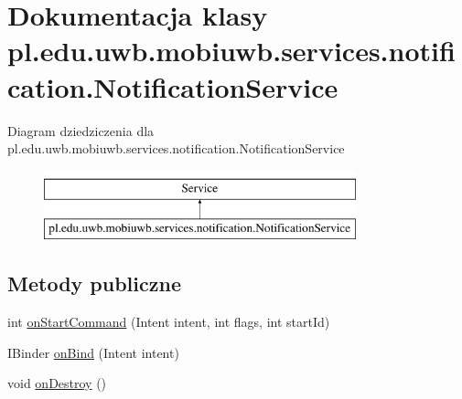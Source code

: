 \hypertarget{classpl_1_1edu_1_1uwb_1_1mobiuwb_1_1services_1_1notification_1_1_notification_service}{}\section{Dokumentacja klasy pl.\+edu.\+uwb.\+mobiuwb.\+services.\+notification.\+Notification\+Service}
\label{classpl_1_1edu_1_1uwb_1_1mobiuwb_1_1services_1_1notification_1_1_notification_service}
Diagram dziedziczenia dla pl.\+edu.\+uwb.\+mobiuwb.\+services.\+notification.\+Notification\+Service\begin{figure}[H]
\begin{center}
\leavevmode
\includegraphics[height=2.000000cm]{classpl_1_1edu_1_1uwb_1_1mobiuwb_1_1services_1_1notification_1_1_notification_service}
\end{center}
\end{figure}
\subsection*{Metody publiczne}
\begin{DoxyCompactItemize}
\item 
int \hyperlink{classpl_1_1edu_1_1uwb_1_1mobiuwb_1_1services_1_1notification_1_1_notification_service_a1ab6f876a6c0ccaab951257cb8cfed86}{on\+Start\+Command} (Intent intent, int flags, int start\+Id)
\item 
I\+Binder \hyperlink{classpl_1_1edu_1_1uwb_1_1mobiuwb_1_1services_1_1notification_1_1_notification_service_a88df922180b31377225feb105eec8d3e}{on\+Bind} (Intent intent)
\item 
void \hyperlink{classpl_1_1edu_1_1uwb_1_1mobiuwb_1_1services_1_1notification_1_1_notification_service_a2f67e5b85973b36aa293f3a34303b2af}{on\+Destroy} ()
\end{DoxyCompactItemize}
